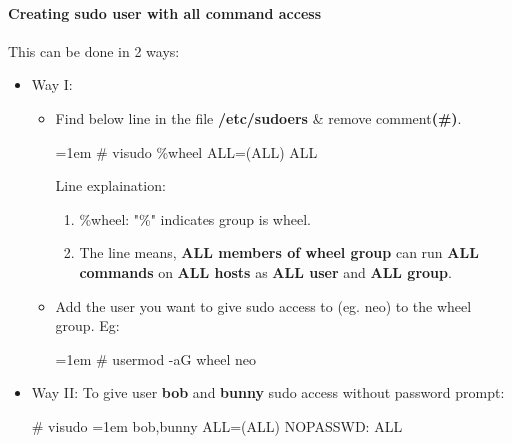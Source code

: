 \begin{flushleft}
	\paragraph{Creating sudo user with all command access}
	This can be done in 2 ways:
	\begin{itemize}
		\item Way I:
		\begin{itemize}
			\item Find below line in the file \textbf{/etc/sudoers} \& remove comment\textbf{(\#)}.
			\begin{tcolorbox}[breakable,notitle,boxrule=-0pt,colback=black,colframe=black]
				\color{green}
				\font=1em
				\# visudo
				\newline
				\color{white}
				\%wheel ALL=(ALL) ALL
				\font=4pt
			\end{tcolorbox}
			Line explaination:
			\begin{enumerate}
				\item \%wheel: "\%" indicates group is wheel.
				\item The line means, \textbf{ALL members of wheel group} can run \textbf{ALL commands} on \textbf{ALL hosts} as \textbf{ALL user} and \textbf{ALL group}. 
			\end{enumerate}
			\item Add the user you want to give sudo access to (eg. neo) to the wheel group.
			\newline
			Eg:
			\bigskip
			\begin{tcolorbox}[breakable,notitle,boxrule=-0pt,colback=black,colframe=black]
				\color{green}
				\font=1em
				\# usermod -aG wheel neo
				\font=4pt
			\end{tcolorbox}
		\end{itemize}
		\bigskip
		\item Way II:
		\newline
		To give user \textbf{bob} and \textbf{bunny} sudo access without password prompt:
		\bigskip
		\begin{tcolorbox}[breakable,notitle,boxrule=-0pt,colback=black,colframe=black]
			\color{green}
			\# visudo
			\font=1em
			\newline
			\color{white}
			bob,bunny ALL=(ALL) NOPASSWD: ALL
			\font=4pt
		\end{tcolorbox}
		\end{itemize}
	
	\newpage
	

\end{flushleft}
